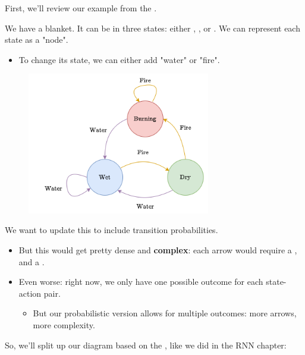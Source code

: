         First, we'll review our example from the .

        \miniex We have a blanket. It can be in three states: either , , or . We can represent each state as a "node".

        \begin{itemize}
            \item To change its state, we can either add "water" or "fire".
        \end{itemize}
        
        \begin{figure}[H]
            \centering
            \includegraphics[width=80mm,scale=0.4]{images/rnn_images/std_fire_and_water.png}
        \end{figure}

        We want to update this to include transition probabilities.
        
        \begin{itemize}
            \item But this would get pretty dense and \textbf{complex}: each arrow would require a , and a .
            \item Even worse: right now, we only have one possible outcome for each state-action pair.
                \begin{itemize}
                    \item But our probabilistic version allows for multiple outcomes: more arrows, more complexity.
                \end{itemize}
                    
        \end{itemize}

        So, we'll split up our diagram based on the , like we did in the RNN chapter:
        
